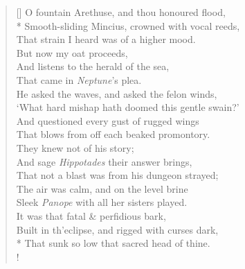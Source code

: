\documentclass[MAIN]{subfiles}
\begin{document}
\begin{verse}[\versewidth]
O fountain {\sc Arethuse}, and thou honoured flood,\\*
Smooth-sliding {\sc Mincius}, crowned with vocal reeds,\\
That strain I heard was of a higher mood.\\
But now my oat proceeds,\\
And listens to the herald of the sea,\\
That came in \emph{Neptune}'s plea.\\
He asked the waves, and asked the felon winds,\\
`What hard mishap hath doomed this gentle swain?'\\
And questioned every gust of rugged wings\\
That blows from off each beaked promontory.\\
They knew not of his story;\\
And sage \emph{Hippotades} their answer brings,\\
That not a blast was from his dungeon strayed;\\
The air was calm, and on the level brine\\
Sleek \emph{Panope} with all her sisters played.\\
It was that fatal \& perfidious bark,\\
Built in th'eclipse, and rigged with curses dark,\\*
That sunk so low that sacred head of thine.\\!


\end{verse}
\end{document}
